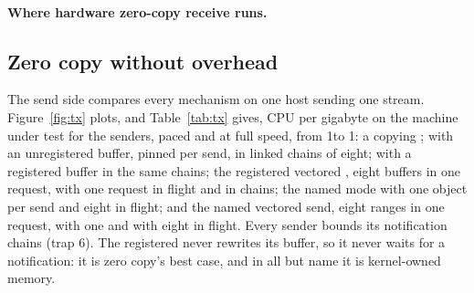 \paragraph{Where hardware zero-copy receive runs.} 

\subsection{Zero copy without overhead}
\label{sec:eval:tx}

The send side compares every mechanism on one host sending one stream.
Figure~\ref{fig:tx} plots, and Table~\ref{tab:tx} gives, CPU per gigabyte on the machine under
test for the senders, paced and at full speed, from 1\KiB to 1\MiB: a copying ; \sendzc with an unregistered buffer, pinned per send,
in linked chains of eight; \sendzc with a registered buffer in the same chains; the registered
vectored \sendzc, eight buffers in one request, with one request in flight and in chains; the
named mode with one object per send and eight in flight; and the named vectored send, eight
ranges in one request, with one and with eight in flight. Every \sendzc sender bounds its
notification chains (trap 6). The registered \sendzc never rewrites its buffer, so it never
waits for a notification: it is zero copy's best case, and in all but name it is kernel-owned
memory.




